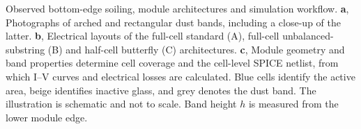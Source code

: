 Observed bottom-edge soiling, module architectures and simulation workflow. \textbf{a}, Photographs of arched and rectangular dust bands, including a close-up of the latter. \textbf{b}, Electrical layouts of the full-cell standard (A), full-cell unbalanced-substring (B) and half-cell butterfly (C) architectures. \textbf{c}, Module geometry and band properties determine cell coverage and the cell-level SPICE netlist, from which I--V curves and electrical losses are calculated. Blue cells identify the active area, beige identifies inactive glass, and grey denotes the dust band. The illustration is schematic and not to scale. Band height $h$ is measured from the lower module edge.
